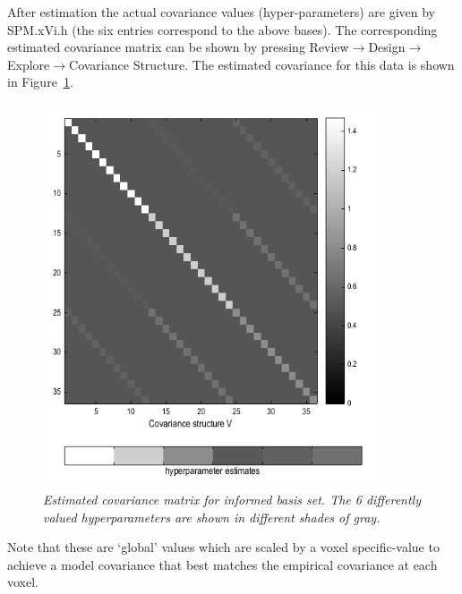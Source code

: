 After estimation the actual covariance values (hyper-parameters) are given by SPM.xVi.h (the six entries correspond to the above bases). The corresponding estimated 
covariance matrix can be shown by pressing Review$\rightarrow$Design$\rightarrow$Explore$\rightarrow$Covariance Structure. The estimated covariance for this data is shown in Figure~\ref{informed_covariance}.
\begin{figure}
\begin{center}
\includegraphics[width=100mm]{informed_covariance}
\caption{\em Estimated covariance matrix for informed basis set. The 6 differently valued hyperparameters are shown in different shades of gray. \label{informed_covariance}}
\end{center}
\end{figure}
Note that these are `global' values which are scaled by a voxel specific-value to achieve a model covariance that best matches the empirical covariance at each voxel. 

